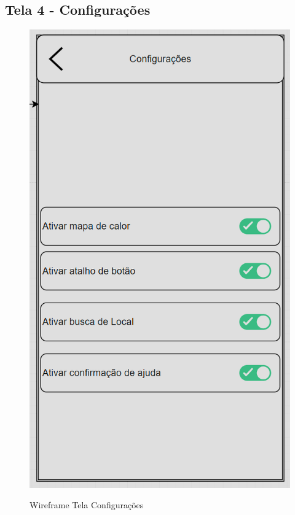 \subsection{Tela 4 - Configurações}
\begin{figure}[h]
  \begin{center}
  \includegraphics[width=0.7\linewidth]{images/wire-tela-configuracoes.png}\\
  \end{center}
  \caption[Wireframe Tela Configurações]{Wireframe Tela Configurações}
  \label{fig:wireframe-tela-configuracoes}
\end{figure}
\clearpage
